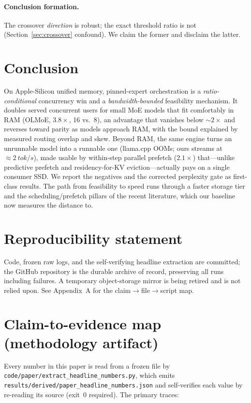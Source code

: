 \documentclass[11pt]{article}
\newcommand{\ppl}{\ensuremath{\times}}
\begin{document}
\paragraph{Conclusion formation.} The crossover \emph{direction} is robust; the exact
threshold ratio is not (Section~\ref{sec:crossover} confound). We claim the former and
disclaim the latter.

\section{Conclusion}

On Apple-Silicon unified memory, pinned-expert orchestration is a
\emph{ratio-conditional} concurrency win and a \emph{bandwidth-bounded} feasibility
mechanism. It doubles served concurrent users for small MoE models that fit comfortably
in RAM (OLMoE, $3.8\ppl$, 16 vs.\ 8), an advantage that vanishes below ${\sim}2\ppl$ and
reverses toward parity as models approach RAM, with the bound explained by measured
routing overlap and skew. Beyond RAM, the same engine turns an unrunnable model into a
runnable one (llama.cpp OOMs; ours streams at ${\approx}\SI{2}{tok/s}$), made usable by
within-step parallel prefetch ($2.1\ppl$) that---unlike predictive prefetch and
residency-for-KV eviction---actually pays on a single consumer SSD. We report the
negatives and the corrected perplexity gate as first-class results. The path from
feasibility to speed runs through a faster storage tier and the scheduling/prefetch
pillars of the recent literature, which our baseline now measures the distance to.

\section*{Reproducibility statement}
Code, frozen raw logs, and the self-verifying headline extraction are committed; the
GitHub repository is the durable archive of record, preserving all runs including
failures. A temporary object-storage mirror is being retired and is not relied upon.
See Appendix~A for the claim$\rightarrow$file$\rightarrow$script map.

\appendix

\section{Claim-to-evidence map (methodology artifact)}

Every number in this paper is read from a frozen file by
\texttt{code/paper/extract\_headline\_numbers.py}, which emits
\texttt{results/derived/paper\_headline\_numbers.json} and self-verifies each value by
re-reading its source (exit~0 required). The primary traces:
\end{document}
